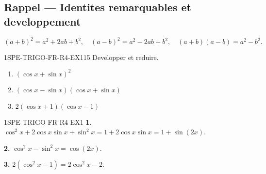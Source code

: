 

\subsection*{Rappel — Identites remarquables et developpement}

\[
  (a+b)^2 = a^2 + 2ab + b^2, \quad (a-b)^2 = a^2 - 2ab + b^2, \quad (a+b)(a-b) = a^2 - b^2.
\]

\begin{exercice}{1SPE-TRIGO-FR-R4-EX1}{1}{5}
Developper et reduire.
\begin{enumerate}
  \item $(\cos x + \sin x)^2$
  \item $(\cos x - \sin x)(\cos x + \sin x)$
  \item $2(\cos x + 1)(\cos x - 1)$
\end{enumerate}
\end{exercice}


\begin{corrige}{1SPE-TRIGO-FR-R4-EX1}
\textbf{1.} $\cos^2 x + 2\cos x\sin x + \sin^2 x = 1 + 2\cos x\sin x = 1 + \sin(2x)$.

\textbf{2.} $\cos^2 x - \sin^2 x = \cos(2x)$.

\textbf{3.} $2(\cos^2 x - 1) = 2\cos^2 x - 2$.
\end{corrige}
